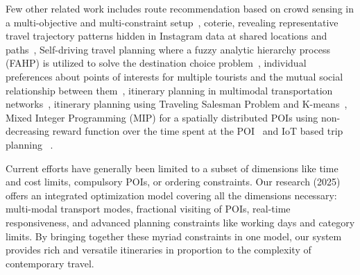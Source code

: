 \documentclass[sigconf,authordraft]{acmart}
\begin{document}
Few other related work includes route recommendation based on crowd sensing in a multi-objective and multi-constraint setup~\cite{zheng2021novel}, coterie, revealing representative travel trajectory patterns hidden in Instagram data at shared locations and paths~\cite{yu2017mining}, Self-driving travel planning where a fuzzy analytic hierarchy process (FAHP) is utilized to solve the destination choice problem~\cite{jiaoman2018travel}, individual preferences about points of interests for multiple tourists and the mutual social relationship between them~\cite{sylejmani2017planning}, itinerary planning in multimodal transportation networks~\cite{zografos2008algorithms}, itinerary planning using Traveling Salesman Problem and K-means~\cite{rani2018development}, Mixed Integer Programming (MIP) for a spatially distributed POIs using non-decreasing reward function over the time spent at the POI~\cite{yu2014optimal} and IoT based trip planning ~\cite{arora2024itinerary}.   

Current efforts have generally been limited to a subset of dimensions like time and cost limits, compulsory POIs, or ordering constraints. Our research (2025) offers an integrated optimization model covering all the dimensions necessary: multi-modal transport modes, fractional visiting of POIs, real-time responsiveness, and advanced planning constraints like working days and category limits. By bringing together these myriad constraints in one model, our system provides rich and versatile itineraries in proportion to the complexity of contemporary travel.
\end{document}
